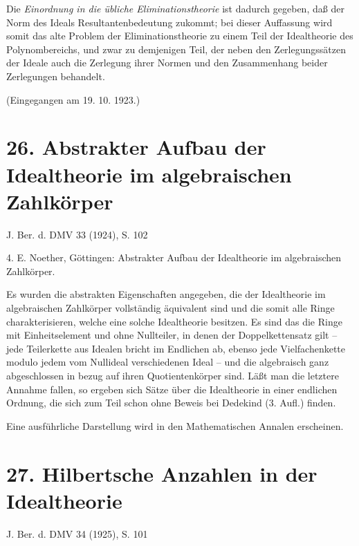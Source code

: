 \documentclass[11pt]{article}
\begin{document}
Die \emph{Einordnung in die übliche Eliminationstheorie} ist dadurch gegeben, daß der Norm des Ideals Resultantenbedeutung zukommt; bei dieser Auffassung wird somit das alte Problem der Eliminationstheorie zu einem Teil der Idealtheorie des Polynombereichs, und zwar zu demjenigen Teil, der neben den Zerlegungssätzen der Ideale auch die Zerlegung ihrer Normen und den Zusammenhang beider Zerlegungen behandelt.

\begin{center}
(Eingegangen am 19. 10. 1923.)
\end{center}

\section*{26. Abstrakter Aufbau der Idealtheorie im algebraischen Zahlkörper}

\begin{center}
J. Ber. d. DMV 33 (1924), S. 102
\end{center}

4. E. Noether, Göttingen: Abstrakter Aufbau der Idealtheorie im algebraischen Zahlkörper.

Es wurden die abstrakten Eigenschaften angegeben, die der Idealtheorie im algebraischen Zahlkörper vollständig äquivalent sind und die somit alle Ringe charakterisieren, welche eine solche Idealtheorie besitzen. Es sind das die Ringe mit Einheitselement und ohne Nullteiler, in denen der Doppelkettensatz gilt -- jede Teilerkette aus Idealen bricht im Endlichen ab, ebenso jede Vielfachenkette modulo jedem vom Nullideal verschiedenen Ideal -- und die algebraisch ganz abgeschlossen in bezug auf ihren Quotientenkörper sind. Läßt man die letztere Annahme fallen, so ergeben sich Sätze über die Idealtheorie in einer endlichen Ordnung, die sich zum Teil schon ohne Beweis bei Dedekind (3. Aufl.) finden.

Eine ausführliche Darstellung wird in den Mathematischen Annalen erscheinen.

\section*{27. Hilbertsche Anzahlen in der Idealtheorie}

\begin{center}
J. Ber. d. DMV 34 (1925), S. 101
\end{center}
\end{document}
